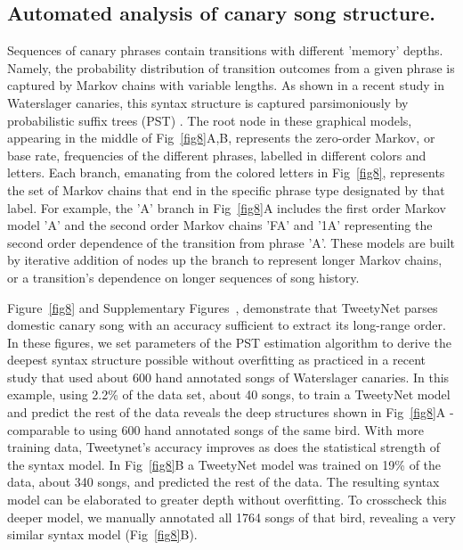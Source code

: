 \documentclass[10pt,letterpaper]{article}
\begin{document}
\subsection*{Automated analysis of canary song structure. }

Sequences of canary phrases contain transitions with different 'memory' depths. Namely, the probability distribution of transition outcomes from a given phrase is captured by Markov chains with variable lengths. As shown in a recent study in Waterslager canaries, this syntax structure is captured parsimoniously by probabilistic suffix trees (PST) \cite{ron_power_1996,markowitz_long-range_2013}. 
The root node in these graphical models, appearing in the middle of Fig~\ref{fig8}A,B, represents the zero-order Markov, or base rate, frequencies of the different phrases, labelled in different colors and letters. Each branch, emanating from the colored letters in Fig~\ref{fig8}, represents the set of Markov chains that end in the specific phrase type designated by that label. For example, the 'A' branch in Fig~\ref{fig8}A includes the first order Markov model 'A' and the second order Markov chains 'FA' and '1A' representing the second order dependence of the transition from phrase 'A'.
These models are built by iterative addition of nodes up the branch to represent longer Markov chains, or a transition's dependence on longer sequences of song history. 

Figure~\ref{fig8} and Supplementary Figures~, demonstrate that TweetyNet parses domestic canary song with an accuracy sufficient to extract its long-range order. In these figures, we set parameters of the PST estimation algorithm to derive the deepest syntax structure possible without overfitting as practiced in a recent study \cite{markowitz_long-range_2013} that used about 600 hand annotated songs of Waterslager canaries. In this example, using 2.2\% of the data set, about 40 songs, to train a TweetyNet model and predict the rest of the data reveals the deep structures shown in Fig~\ref{fig8}A - comparable to using 600 hand annotated songs of the same bird. With more training data, Tweetynet's accuracy improves as does the statistical strength of the syntax model. In Fig~\ref{fig8}B a TweetyNet model was trained on 19\% of the data, about 340 songs, and predicted the rest of the data. The resulting syntax model can be elaborated to greater depth without overfitting. To crosscheck this deeper model, we manually annotated all 1764 songs of that bird, revealing a very similar syntax model (Fig~\ref{fig8}B).
\end{document}
